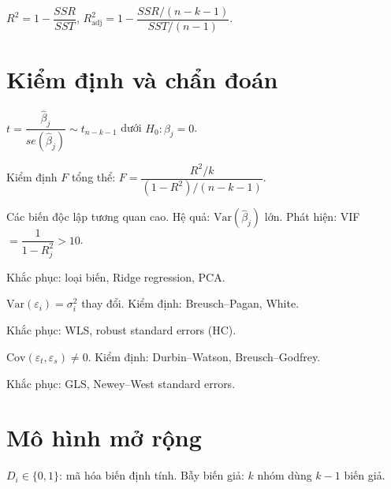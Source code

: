 \documentclass[12pt,a4paper]{article}
\begin{document}
\begin{congthuc}[title={$R^2$ và $R^2$ hiệu chỉnh}]
  $R^2 = 1 - \dfrac{SSR}{SST}$, $R^2_{\text{adj}} = 1 - \dfrac{SSR/(n-k-1)}{SST/(n-1)}$.
\end{congthuc}

\section{Kiểm định và chẩn đoán}

\begin{phuongphap}[title={Kiểm định ý nghĩa hệ số}]
  $t = \dfrac{\hat{\beta}_j}{se(\hat{\beta}_j)} \sim t_{n-k-1}$ dưới $H_0: \beta_j = 0$.

  Kiểm định $F$ tổng thể: $F = \dfrac{R^2/k}{(1-R^2)/(n-k-1)}$.
\end{phuongphap}

\begin{dinhnghia}[title={Đa cộng tuyến}]
  Các biến độc lập tương quan cao. Hệ quả: $\text{Var}(\hat{\beta}_j)$ lớn. Phát hiện: VIF $= \dfrac{1}{1 - R_j^2} > 10$.

  Khắc phục: loại biến, Ridge regression, PCA.
\end{dinhnghia}

\begin{dinhnghia}[title={Phương sai thay đổi (Heteroscedasticity)}]
  $\text{Var}(\varepsilon_i) = \sigma_i^2$ thay đổi. Kiểm định: Breusch--Pagan, White.

  Khắc phục: WLS, robust standard errors (HC).
\end{dinhnghia}

\begin{dinhnghia}[title={Tự tương quan}]
  $\text{Cov}(\varepsilon_t, \varepsilon_s) \ne 0$. Kiểm định: Durbin--Watson, Breusch--Godfrey.

  Khắc phục: GLS, Newey--West standard errors.
\end{dinhnghia}

\section{Mô hình mở rộng}

\begin{dinhnghia}[title={Biến giả (Dummy)}]
  $D_i \in \{0, 1\}$: mã hóa biến định tính. Bẫy biến giả: $k$ nhóm dùng $k - 1$ biến giả.
\end{dinhnghia}
\end{document}
